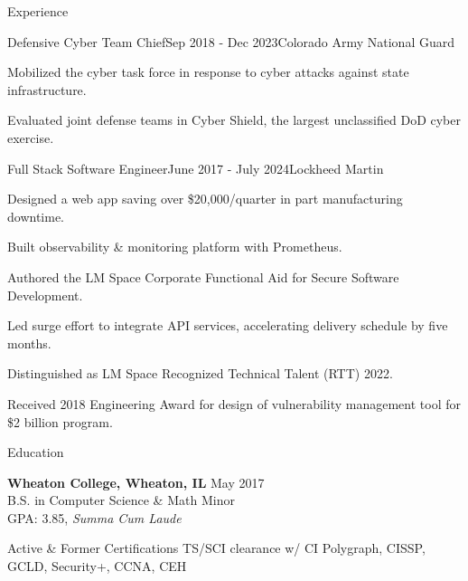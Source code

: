\documentclass[
	a4paper, %
	11pt, %
]{resume} %
\begin{document}
\begin{rSection}{Experience}
\begin{rSubsection}{Defensive Cyber Team Chief}{Sep 2018 - Dec 2023}{Colorado Army National Guard}
		\item Mobilized the cyber task force in response to cyber attacks against state infrastructure.
		\item Evaluated joint defense teams in Cyber Shield, the largest unclassified DoD cyber exercise.
	\end{rSubsection}
	\begin{rSubsection}{Full Stack Software Engineer}{June 2017 - July 2024}{Lockheed Martin}
		\item Designed a web app saving over \$20,000/quarter in part manufacturing downtime.
		\item Built observability \& monitoring platform with Prometheus.
		\item Authored the LM Space Corporate Functional Aid for Secure Software Development.
		\item Led surge effort to integrate API services, accelerating delivery schedule by five months.
		\item Distinguished as LM Space Recognized Technical Talent (RTT) 2022.
		\item Received 2018 Engineering Award for design of vulnerability management tool for \$2 billion program.
	\end{rSubsection}
\end{rSection}

\begin{rSection}{Education}
	
	\textbf{Wheaton College, Wheaton, IL} \hfill May 2017 \\ 
	B.S. in Computer Science \& Math Minor \\
	GPA: 3.85, \textit{Summa Cum Laude}
	
\end{rSection}
\begin{rSection}{Active \& Former Certifications}
	TS/SCI clearance w/ CI Polygraph, CISSP, GCLD, Security+, CCNA, CEH
\end{rSection}
\end{document}
